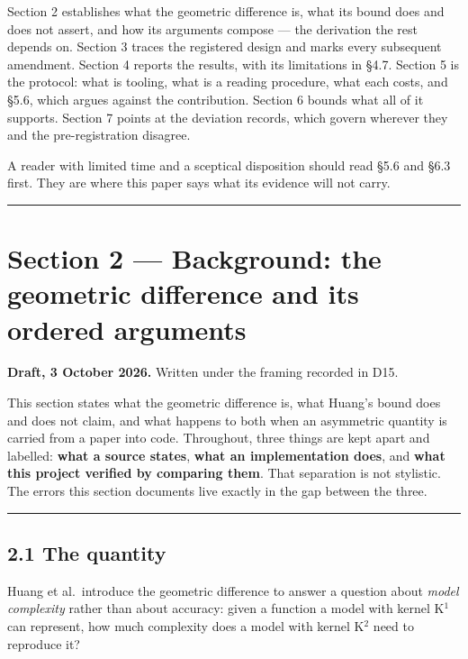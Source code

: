 \documentclass[
  10pt,
]{article}
\begin{document}
Section 2 establishes what the geometric difference is, what its bound
does and does not assert, and how its arguments compose --- the
derivation the rest depends on. Section 3 traces the registered design
and marks every subsequent amendment. Section 4 reports the results,
with its limitations in \S{}4.7. Section 5 is the protocol: what is
tooling, what is a reading procedure, what each costs, and \S{}5.6,
which argues against the contribution. Section 6 bounds what all of it
supports. Section 7 points at the deviation records, which govern
wherever they and the pre-registration disagree.

A reader with limited time and a sceptical disposition should read
\S{}5.6 and \S{}6.3 first. They are where this paper says what its
evidence will not carry.

\begin{center}\rule{0.5\linewidth}{0.5pt}\end{center}

\section{Section 2 --- Background: the geometric difference and its
ordered
arguments}\label{section-2-background-the-geometric-difference-and-its-ordered-arguments}

\textbf{Draft, 3 October 2026.} Written under the framing recorded in
D15.

This section states what the geometric difference is, what Huang's bound
does and does not claim, and what happens to both when an asymmetric
quantity is carried from a paper into code. Throughout, three things are
kept apart and labelled: \textbf{what a source states}, \textbf{what an
implementation does}, and \textbf{what this project verified by
comparing them}. That separation is not stylistic. The errors this
section documents live exactly in the gap between the three.

\begin{center}\rule{0.5\linewidth}{0.5pt}\end{center}

\subsection{2.1 The quantity}\label{the-quantity}

Huang et al.~introduce the geometric difference to answer a question
about \emph{model complexity} rather than about accuracy: given a
function a model with kernel K\(^{1}\) can represent, how much
complexity does a model with kernel K\(^{2}\) need to reproduce it?
\end{document}
